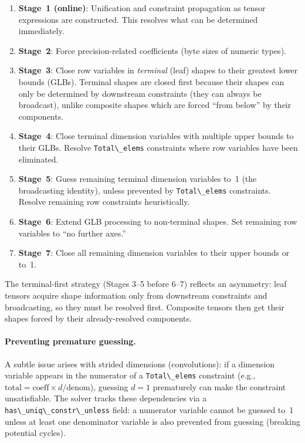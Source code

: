 \documentclass[acmsmall,nonacm,review]{acmart}
\newcommand{\code}[1]{\lstinline[basicstyle=\normalsize\ttfamily]{#1}}
\begin{document}
\begin{enumerate}
\item \textbf{Stage~1 (online)}: Unification and constraint propagation as
  tensor expressions are constructed. This resolves what can be determined
  immediately.
\item \textbf{Stage~2}: Force precision-related coefficients (byte sizes of
  numeric types).
\item \textbf{Stage~3}: Close row variables in \emph{terminal} (leaf) shapes
  to their greatest lower bounds (GLBs). Terminal shapes are closed first
  because their shapes can only be determined by downstream constraints (they
  can always be broadcast), unlike composite shapes which are forced ``from
  below'' by their components.
\item \textbf{Stage~4}: Close terminal dimension variables with multiple
  upper bounds to their GLBs. Resolve \code{Total\_elems} constraints where
  row variables have been eliminated.
\item \textbf{Stage~5}: Guess remaining terminal dimension variables to~1
  (the broadcasting identity), unless prevented by \code{Total\_elems}
  constraints. Resolve remaining row constraints heuristically.
\item \textbf{Stage~6}: Extend GLB processing to non-terminal shapes. Set
  remaining row variables to ``no further axes.''
\item \textbf{Stage~7}: Close all remaining dimension variables to their
  upper bounds or to~1.
\end{enumerate}

The terminal-first strategy (Stages 3--5 before 6--7) reflects an asymmetry:
leaf tensors acquire shape information only from downstream constraints and
broadcasting, so they must be resolved first. Composite tensors then get
their shapes forced by their already-resolved components.

\paragraph{Preventing premature guessing.}
A subtle issue arises with strided dimensions (convolutions): if a dimension
variable appears in the numerator of a \code{Total\_elems} constraint (e.g.,
$\text{total} = \text{coeff} \times d / \text{denom}$), guessing $d = 1$
prematurely can make the constraint unsatisfiable. The solver tracks these
dependencies via a \code{has\_uniq\_constr\_unless} field: a numerator
variable cannot be guessed to~1 unless at least one denominator variable is
also prevented from guessing (breaking potential cycles).
\end{document}
